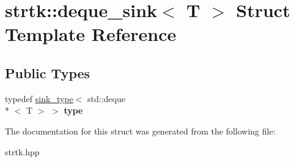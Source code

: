 \hypertarget{structstrtk_1_1deque__sink}{\section{strtk\-:\-:deque\-\_\-sink$<$ T $>$ Struct Template Reference}
\label{structstrtk_1_1deque__sink}
}
\subsection*{Public Types}
\begin{DoxyCompactItemize}
\item 
\hypertarget{structstrtk_1_1deque__sink_a49184fb04ab829b6b2ada53c11b05551}{typedef \hyperlink{classstrtk_1_1sink__type}{sink\-\_\-type}$<$ std\-::deque\\*
$<$ T $>$ $>$ {\bfseries type}}\label{structstrtk_1_1deque__sink_a49184fb04ab829b6b2ada53c11b05551}

\end{DoxyCompactItemize}


The documentation for this struct was generated from the following file\-:\begin{DoxyCompactItemize}
\item 
strtk.\-hpp\end{DoxyCompactItemize}
